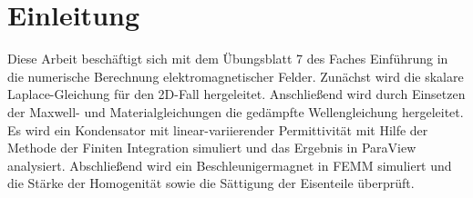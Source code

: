 \chapter{Einleitung}\label{sec:intro}
Diese Arbeit beschäftigt sich mit dem Übungsblatt 7 des Faches \glqq Einführung in die numerische Berechnung elektromagnetischer Felder\grqq{}. Zunächst wird die skalare Laplace-Gleichung für den 2D-Fall hergeleitet. Anschließend wird durch Einsetzen der Maxwell- und Materialgleichungen die gedämpfte Wellengleichung hergeleitet.
Es wird ein Kondensator mit linear-variierender Permittivität mit Hilfe der Methode der Finiten Integration simuliert und das Ergebnis in ParaView analysiert. 
Abschließend wird ein Beschleunigermagnet in FEMM simuliert und die Stärke der Homogenität sowie die Sättigung der Eisenteile überprüft.